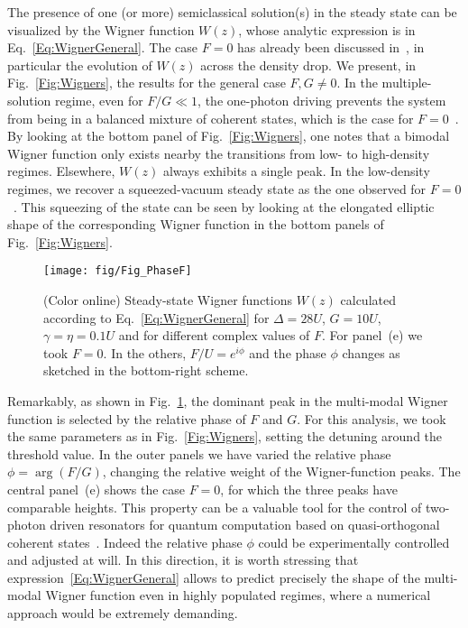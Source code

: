 The presence of one (or more) semiclassical solution(s) in the steady state can be visualized by the Wigner function $W(z)$, whose analytic expression is in Eq.~\eqref{Eq:WignerGeneral}.
The case $F=0$ has already been discussed in~\cite{MeaneyEPJQT14}, in particular the evolution of $W(z)$ across the density drop.
We present, in Fig.~\ref{Fig:Wigners}, the results for the general case $F,G\neq0$.
In the multiple-solution regime, even for $F/G\ll1$, the one-photon driving prevents the system from being in a balanced mixture of coherent states, which is the case for $F=0$~\cite{MeaneyEPJQT14,MirrahimiNJP14,LeghtasScience15,MingantiSciRep16,ElliottarXiv16}.
By looking at the bottom panel of Fig.~\ref{Fig:Wigners}, one notes that a bimodal Wigner function only exists nearby the transitions from low- to high-density regimes.
Elsewhere, $W(z)$ always exhibits a single peak.
In the low-density regimes, we recover a squeezed-vacuum steady state as the one observed for $F=0$~\cite{MeaneyEPJQT14,ElliottarXiv16}.
This squeezing of the state can be seen by looking at the elongated elliptic shape of the corresponding Wigner function in the bottom panels of Fig.~\ref{Fig:Wigners}.

\begin{figure}[t]
	\texttt{[image: fig/Fig\_PhaseF]}
\caption{(Color online)
	Steady-state Wigner functions $W(z)$ calculated according to Eq.~\eqref{Eq:WignerGeneral} for $\Delta=28U$, $G=10U$, $\gamma=\eta=0.1U$ and for different complex values of $F$.
	For panel~(e) we took $F=0$.
	In the others, $F/U=e^{i\phi}$ and the phase $\phi$ changes as sketched in the bottom-right scheme.}\label{Fig:PhaseF}
\end{figure}

Remarkably, as shown in Fig.~\ref{Fig:PhaseF}, the dominant peak in the multi-modal Wigner function is selected by the relative phase of $F$ and $G$.
For this analysis, we took the same parameters as in Fig.~\ref{Fig:Wigners}, setting the detuning around the threshold value.
In the outer panels we have varied the relative phase $\phi=\arg(F/G)$, changing the relative weight of the Wigner-function peaks.
The central panel~(e) shows the case $F=0$, for which the three peaks have comparable heights.
This property can be a valuable tool for the control of two-photon driven resonators for quantum computation based on quasi-orthogonal coherent states~\cite{GotoPRA16,PuriarXiv16}.
Indeed the relative phase $\phi$ could be experimentally controlled and adjusted at will.
In this direction, it is worth stressing that expression~\eqref{Eq:WignerGeneral} allows to predict precisely the shape of the multi-modal Wigner function even in highly populated regimes, where a numerical approach would be extremely demanding.



